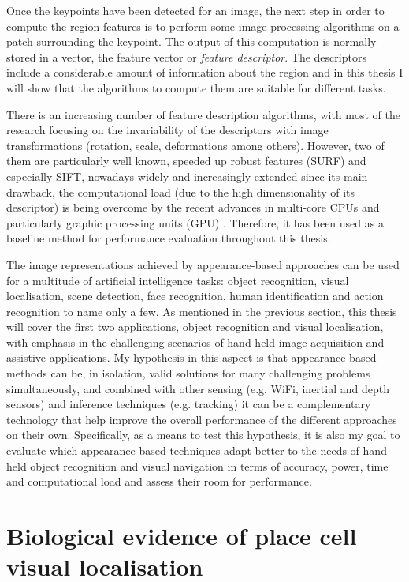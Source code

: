 Once the keypoints have been detected for an image, the next step in order to compute the region features is to perform some image processing algorithms on a patch surrounding the keypoint. The output of this computation is normally stored in a vector, the feature vector or \textit{feature descriptor}. The descriptors include a considerable amount of information about the region and in this thesis I will show that the algorithms to compute them are suitable for different tasks.

There is an increasing number of feature description algorithms, with most of the research focusing on the invariability of the descriptors with image transformations (rotation, scale, deformations among others). However, two of them are particularly well known, speeded up robust features (SURF) and especially SIFT, nowadays widely and increasingly extended since its main drawback, the computational load (due to the high dimensionality of its descriptor) is being overcome by the recent advances in multi-core CPUs and particularly graphic processing units (GPU) \cite{Wu2007}. Therefore, it has been used as a baseline method for performance evaluation throughout this thesis.

The image representations achieved by appearance-based approaches can be used for a multitude of artificial intelligence tasks: object recognition, visual localisation, scene detection, face recognition, human identification and action recognition to name only a few. As mentioned in the previous section, this thesis will cover the first two applications, object recognition and visual localisation, with emphasis in the challenging scenarios of hand-held image acquisition and assistive applications. My hypothesis in this aspect is that appearance-based methods can be, in isolation, valid solutions for many challenging problems simultaneously, and combined with other sensing (e.g. WiFi, inertial and depth sensors) and inference techniques (e.g. tracking) it can be a complementary technology that help improve the overall performance of the different approaches on their own. Specifically, as a means to test this hypothesis, it is also my goal to evaluate which appearance-based techniques adapt better to the needs of hand-held object recognition and visual navigation in terms of accuracy, power, time and computational load and assess their room for performance.

\section{Biological evidence of place cell visual localisation} 

